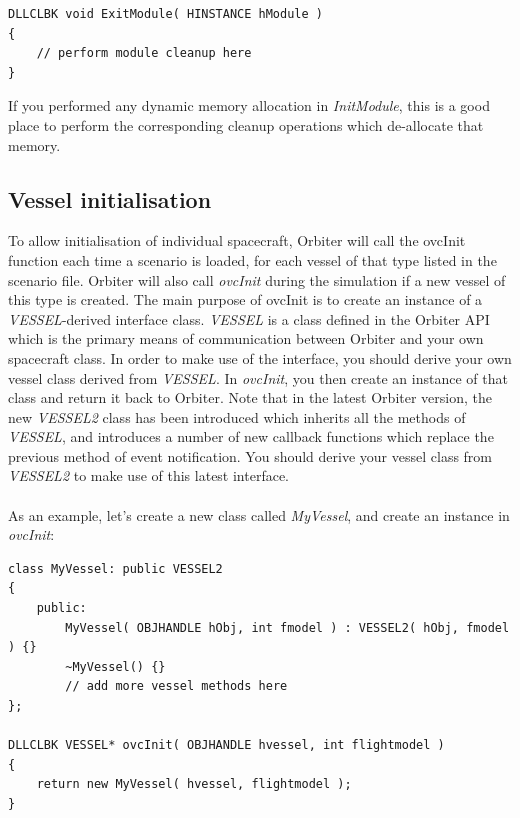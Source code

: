 \documentclass[Orbiter Developer Manual.tex]{subfiles}
\begin{document}
\begin{lstlisting}
DLLCLBK void ExitModule( HINSTANCE hModule )
{
	// perform module cleanup here
}
\end{lstlisting}

\noindent
If you performed any dynamic memory allocation in \textit{InitModule}, this is a good place to perform the corresponding cleanup operations which de-allocate that memory.


\subsection{Vessel initialisation}
\label{ssec:vessel_init}
To allow initialisation of individual spacecraft, Orbiter will call the ovcInit function each time a scenario is loaded, for each vessel of that type listed in the scenario file. Orbiter will also call \textit{ovcInit} during the simulation if a new vessel of this type is created. The main purpose of ovcInit is to create an instance of a \textit{VESSEL}-derived interface class. \textit{VESSEL} is a class defined in the Orbiter API which is the primary means of communication between Orbiter and your own spacecraft class. In order to make use of the interface, you should derive your own vessel class derived from \textit{VESSEL}. In \textit{ovcInit}, you then create an instance of that class and return it back to Orbiter. Note that in the latest Orbiter version, the new \textit{VESSEL2} class has been introduced which inherits all the methods of \textit{VESSEL}, and introduces a number of new callback functions which replace the previous method of event notification. You should derive your vessel class from \textit{VESSEL2} to make use of this latest interface.\\
\\
As an example, let's create a new class called \textit{MyVessel}, and create an instance in \textit{ovcInit}:

\begin{lstlisting}
class MyVessel: public VESSEL2
{
	public:
		MyVessel( OBJHANDLE hObj, int fmodel ) : VESSEL2( hObj, fmodel ) {}
		~MyVessel() {}
		// add more vessel methods here
};

DLLCLBK VESSEL* ovcInit( OBJHANDLE hvessel, int flightmodel )
{
	return new MyVessel( hvessel, flightmodel );
}
\end{lstlisting}
\end{document}
